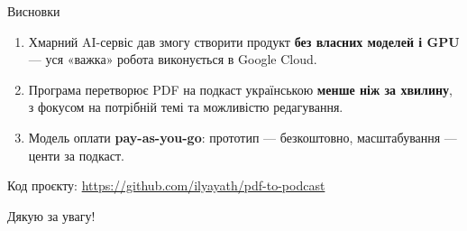 \documentclass[aspectratio=43]{beamer}
\newcommand{\thesis}[1]{\begin{block}{}#1\end{block}}
\begin{document}
\begin{frame}{Висновки}
  \begin{enumerate}
    \item Хмарний AI-сервіс дав змогу створити продукт \textbf{без власних
      моделей і GPU} --- уся «важка» робота виконується в Google Cloud.
    \item Програма перетворює PDF на подкаст українською \textbf{менше ніж
      за хвилину}, з фокусом на потрібній темі та можливістю редагування.
    \item Модель оплати \textbf{pay-as-you-go}: прототип --- безкоштовно,
      масштабування --- центи за подкаст.
  \end{enumerate}

  \thesis{Код проєкту: \url{https://github.com/ilyayath/pdf-to-podcast}}
\end{frame}

\begin{frame}
  \centering
  \vfill
  {\Huge Дякую за увагу!}
  \vfill
\end{frame}
\end{document}
